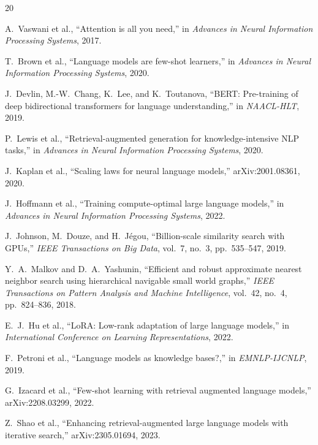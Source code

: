 \documentclass[11pt,a4paper]{article}
\begin{document}

\begin{thebibliography}{20}

A.~Vaswani et al., ``Attention is all you need,'' in \textit{Advances in Neural Information Processing Systems}, 2017.

T.~Brown et al., ``Language models are few-shot learners,'' in \textit{Advances in Neural Information Processing Systems}, 2020.

J.~Devlin, M.-W.~Chang, K.~Lee, and K.~Toutanova, ``BERT: Pre-training of deep bidirectional transformers for language understanding,'' in \textit{NAACL-HLT}, 2019.

P.~Lewis et al., ``Retrieval-augmented generation for knowledge-intensive NLP tasks,'' in \textit{Advances in Neural Information Processing Systems}, 2020.

J.~Kaplan et al., ``Scaling laws for neural language models,'' arXiv:2001.08361, 2020.

J.~Hoffmann et al., ``Training compute-optimal large language models,'' in \textit{Advances in Neural Information Processing Systems}, 2022.

J.~Johnson, M.~Douze, and H.~J{\'e}gou, ``Billion-scale similarity search with GPUs,'' \textit{IEEE Transactions on Big Data}, vol.~7, no.~3, pp.~535--547, 2019.

Y.~A.~Malkov and D.~A.~Yashunin, ``Efficient and robust approximate nearest neighbor search using hierarchical navigable small world graphs,'' \textit{IEEE Transactions on Pattern Analysis and Machine Intelligence}, vol.~42, no.~4, pp.~824--836, 2018.

E.~J.~Hu et al., ``LoRA: Low-rank adaptation of large language models,'' in \textit{International Conference on Learning Representations}, 2022.

F.~Petroni et al., ``Language models as knowledge bases?,'' in \textit{EMNLP-IJCNLP}, 2019.

G.~Izacard et al., ``Few-shot learning with retrieval augmented language models,'' arXiv:2208.03299, 2022.

Z.~Shao et al., ``Enhancing retrieval-augmented large language models with iterative search,'' arXiv:2305.01694, 2023.


\end{thebibliography}
\end{document}
